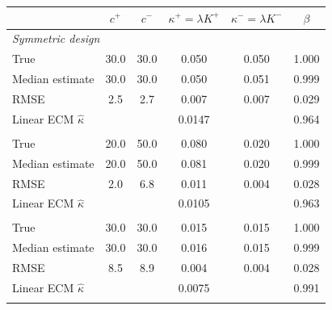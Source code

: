 \begin{tabular}{lccccc}
\toprule
 & $c^+$ & $c^-$ & $\kappa^+=\lambda K^+$ & $\kappa^-=\lambda K^-$ & $\beta$ \\
\midrule
\multicolumn{6}{l}{\textit{Symmetric design}} \\
True & 30.0 & 30.0 & 0.050 & 0.050 & 1.000 \\
Median estimate & 30.0 & 30.0 & 0.050 & 0.051 & 0.999 \\
RMSE & 2.5 & 2.7 & 0.007 & 0.007 & 0.029 \\
Linear ECM $\hat\kappa$ & \multicolumn{4}{c}{0.0147} & 0.964 \\
\addlinespace
\multicolumn{6}{l}{\textit{Asymmetric design}} \\
True & 20.0 & 50.0 & 0.080 & 0.020 & 1.000 \\
Median estimate & 20.0 & 50.0 & 0.081 & 0.020 & 0.999 \\
RMSE & 2.0 & 6.8 & 0.011 & 0.004 & 0.028 \\
Linear ECM $\hat\kappa$ & \multicolumn{4}{c}{0.0105} & 0.963 \\
\addlinespace
\multicolumn{6}{l}{\textit{Low capacity design}} \\
True & 30.0 & 30.0 & 0.015 & 0.015 & 1.000 \\
Median estimate & 30.0 & 30.0 & 0.016 & 0.015 & 0.999 \\
RMSE & 8.5 & 8.9 & 0.004 & 0.004 & 0.028 \\
Linear ECM $\hat\kappa$ & \multicolumn{4}{c}{0.0075} & 0.991 \\
\addlinespace
\bottomrule
\end{tabular}
